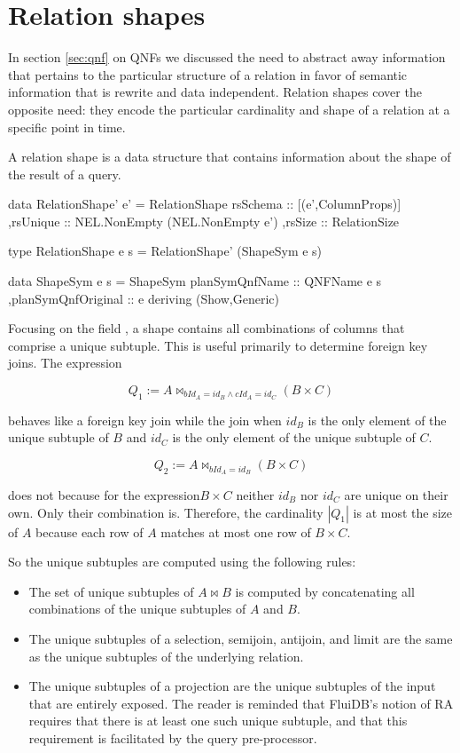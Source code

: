 \section{Relation shapes}
\label{sec:relation_shapes}

In section \ref{sec:qnf} on QNFs we discussed the need to abstract away
information that pertains to the particular structure of a relation in
favor of semantic information that is rewrite and data
independent. Relation shapes cover the opposite need: they encode the
particular cardinality and shape of a relation at a specific point in
time.

A relation shape is a data structure that contains information about
the shape of the result of a query.

\begin{haskellcode}
  data RelationShape' e' =
    RelationShape
    { rsSchema :: [(e',ColumnProps)]
      ,rsUnique :: NEL.NonEmpty (NEL.NonEmpty e')
      ,rsSize :: RelationSize
    }

  type RelationShape e s = RelationShape' (ShapeSym e s)

  data ShapeSym e s =
    ShapeSym { planSymQnfName :: QNFName e s
      ,planSymQnfOriginal :: e
    }
    deriving (Show,Generic)
\end{haskellcode}

Focusing on the field , a shape contains
all combinations of columns that comprise a unique
subtuple.  This is useful primarily to determine foreign key
joins. The expression

\[Q_1 := A \Join_{bId_A = id_B \land cId_A = id_C} (B \times C)\]

behaves like a foreign key join while the join when \(id_B\) is the
only element of the unique subtuple of \(B\) and \(id_C\) is the only
element of the unique subtuple of \(C\).

\[Q_2 := A \Join_{bId_A = id_B} (B \times C)\]

does not because for the expression\(B \times C\) neither \(id_B\) nor
\(id_C\) are unique on their own.  Only their combination
is. Therefore, the cardinality \(|Q_1|\) is at most the size of \(A\)
because each row of \(A\) matches at most one row of \(B \times C\).

So the unique subtuples are computed using the following rules:

\begin{itemize}
\item The set of unique subtuples of \(A \Join B\) is
  computed by concatenating all combinations of the unique subtuples
  of \(A\) and \(B\).
\item The unique subtuples of a selection, semijoin, antijoin, and limit are the same as the unique
  subtuples of the underlying relation.
\item The unique subtuples of a projection are the unique subtuples of
  the input that are entirely exposed.  The reader is reminded that
  FluiDB's notion of RA requires that there is at least one such
  unique subtuple, and that this requirement is facilitated by the
  query pre-processor.
\end{itemize}

